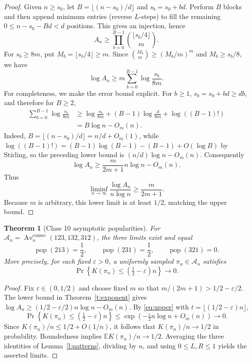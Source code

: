 \documentclass[11pt]{article}
\newtheorem{theorem}{Theorem}
\newcommand{\Av}{\mathcal{A}}
\begin{document}
\begin{proof}
Given $n\ge s_0$, let $B=\lfloor(n-s_0)/d\rfloor$ and $s_b=s_0+bd$. Perform $B$ blocks and then append minimum entries (reverse $L$-steps) to fill the remaining $0\le n-s_0-Bd<d$ positions. This gives an injection, hence
\begin{equation}\label{eq:lower}
A_n\ge\prod_{b=0}^{B-1}\binom{\lfloor s_b/4\rfloor}{m}.
\end{equation}
For $s_b\ge8m$, put $M_b=\lfloor s_b/4\rfloor\ge m$.
Since $\binom{M_b}{m}\ge (M_b/m)^m$ and $M_b\ge s_b/8$, we have
\[
\log A_n\ge m\sum_{b=0}^{B-1}\log\frac{s_b}{8m}.
\]
For completeness, we make the error bound explicit. For $b\ge1$,
$s_b=s_0+bd\ge db$, and therefore for $B\ge2$,
\begin{align*}
\sum_{b=0}^{B-1}\log\frac{s_b}{8m}
&\ge \log\frac{s_0}{8m}+(B-1)\log\frac{d}{8m}+\log((B-1)!)\\
&= B\log n-O_m(n).
\end{align*}
Indeed, $B=\lfloor(n-s_0)/d\rfloor=n/d+O_m(1)$, while
$\log((B-1)!)=(B-1)\log(B-1)-(B-1)+O(\log B)$ by Stirling,
so the preceding lower bound is $(n/d)\log n-O_m(n)$.
Consequently
\[
\log A_n\ge \frac{m}{2m+1}n\log n-O_m(n).
\]
Thus
\[
\liminf_{n\to\infty}\frac{\log A_n}{n\log n}\ge\frac{m}{2m+1}.
\]
Because $m$ is arbitrary, this lower limit is at least $1/2$, matching the upper bound.
\end{proof}

\begin{theorem}[Class 10 asymptotic popularities]\label{t:main}
For $\Av_n=\operatorname{Av}^{\mathrm{consec}}_n(123,132,312)$, the three limits exist and equal
\[
\boxed{\operatorname{pop}(213)=\frac12,\qquad
\operatorname{pop}(231)=\frac12,\qquad
\operatorname{pop}(321)=0.}
\]
More precisely, for each fixed $\varepsilon>0$, a uniformly sampled $\pi_n\in\Av_n$ satisfies
\[
\Pr\!\left\{K(\pi_n)\le(\tfrac12-\varepsilon)n\right\}\longrightarrow0.
\]
\end{theorem}
\begin{proof}
Fix $\varepsilon\in(0,1/2)$ and choose fixed $m$ so that $m/(2m+1)>1/2-\varepsilon/2$. The lower bound in Theorem~\ref{t:exponent} gives
$\log A_n\ge(1/2-\varepsilon/2)n\log n-O_m(n)$.
By \eqref{eq:upper} with $t=\lfloor(1/2-\varepsilon)n\rfloor$,
\[
\Pr\!\left\{K(\pi_n)\le(\tfrac12-\varepsilon)n\right\}
\le \exp\!\left(-\tfrac{\varepsilon}{2}n\log n+O_m(n)\right)\longrightarrow0.
\]
Since $K(\pi_n)/n\le1/2+O(1/n)$, it follows that $K(\pi_n)/n\to1/2$ in probability. Boundedness implies $\mathbb E K(\pi_n)/n\to1/2$. Averaging the three identities of Lemma~\ref{l:patterns}, dividing by $n$, and using $0\le L,R\le1$ yields the asserted limits.
\end{proof}
\end{document}
